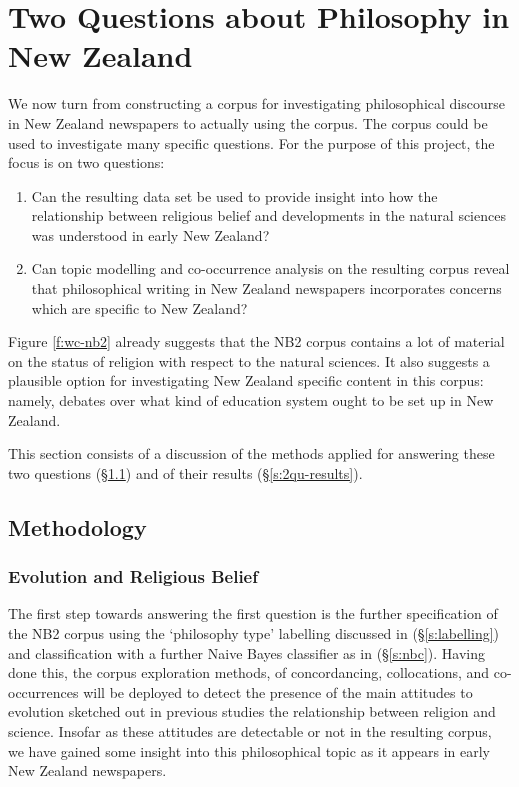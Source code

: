 \documentclass{article}
\begin{document}
\section{Two Questions about Philosophy in New Zealand}\label{s:investigation}

We now turn from constructing a corpus for investigating philosophical discourse in New Zealand newspapers to actually using the corpus. The corpus could be used to investigate many specific questions. For the purpose of this project, the focus is on two questions:
\begin{enumerate}
  \item Can the resulting data set be used to provide insight into how the relationship between religious belief and developments in the natural sciences was understood in early New Zealand?
  \item Can topic modelling and co-occurrence analysis on the resulting corpus reveal that philosophical writing in New Zealand newspapers incorporates concerns which are specific to New Zealand?
\end{enumerate}

Figure \ref{f:wc-nb2} already suggests that the NB2 corpus contains a lot of material on the status of religion with respect to the natural sciences. It also suggests a plausible option for investigating New Zealand specific content in this corpus: namely, debates over what kind of education system ought to be set up in New Zealand.

This section consists of a discussion of the methods applied for answering these two questions (\S \ref{s:2qu-methods}) and of their results (\S \ref{s:2qu-results}).

\subsection{Methodology}\label{s:2qu-methods}

\subsubsection{Evolution and Religious Belief}

The first step towards answering the first question is the further specification of the NB2 corpus using the `philosophy type' labelling discussed in (\S \ref{s:labelling}) and classification with a further Naive Bayes classifier as in (\S \ref{s:nbc}). Having done this, the corpus exploration methods, of concordancing, collocations, and co-occurrences will be deployed to detect the presence of the main attitudes to evolution sketched out in previous studies the relationship between religion and science. Insofar as these attitudes are detectable or not in the resulting corpus, we have gained some insight into this philosophical topic as it appears in early New Zealand newspapers.
\end{document}
